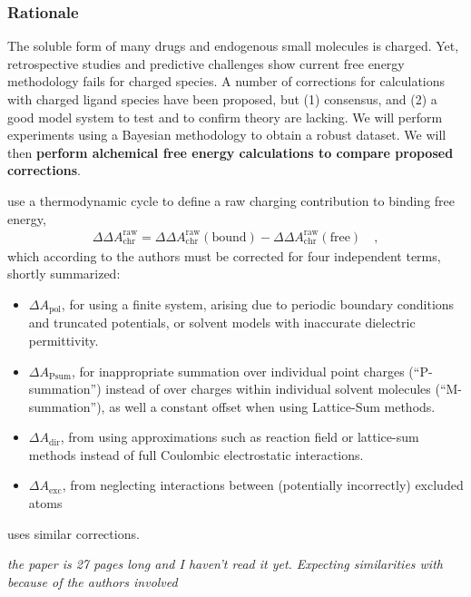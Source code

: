 \documentclass[10pt,final]{article}
\begin{document}
\subsubsection*{Rationale}
The soluble form of many drugs and endogenous small molecules is charged. Yet, retrospective studies and predictive challenges show current free energy methodology fails for charged species\cite{Rocklin2013b,Muddana2014a}.
A number of corrections for calculations with charged ligand species have been proposed, but (1) consensus, and (2) a good model system to test and to confirm theory are lacking\cite{Reif2013a,Rocklin2013a, Lin2014a}. We will perform experiments using a Bayesian methodology to obtain a robust dataset. We will then \textbf{ perform alchemical free energy calculations to compare proposed corrections}.

\textcite{Reif2013a} use a thermodynamic cycle to define a raw charging contribution to binding free energy,
\begin{align}
	\Delta\Delta A^\mathrm{raw}_\mathrm{chr} = \Delta\Delta A^\mathrm{raw}_\mathrm{chr}(\mathrm{bound}) - \Delta\Delta A^\mathrm{raw}_\mathrm{chr}(\mathrm{free}) \quad,
\end{align}
which according to the authors must be corrected for four independent terms, shortly summarized:
\begin{itemize}
  \item $\Delta A_\mathrm{pol}$, for using a finite system, arising due to periodic boundary conditions and truncated potentials, or solvent models with inaccurate dielectric permittivity.
  \item $\Delta A_\mathrm{Psum}$, for inappropriate summation over individual point charges (``P-summation'') instead of over charges within individual solvent molecules  (``M-summation''), as well a constant offset when using Lattice-Sum methods. \cite{Kastenholz2006a}
  \item $\Delta A_\mathrm{dir}$, from using approximations such as reaction field or lattice-sum methods instead of full Coulombic electrostatic interactions.
  \item $\Delta A_\mathrm{exc}$, from neglecting interactions between (potentially incorrectly) excluded atoms 
\end{itemize}

\textcite{Rocklin2013a} uses similar corrections.

\emph{the paper is 27 pages long and I haven't read it yet. Expecting similarities with \textcite{Reif2013a} because of the authors involved}
\end{document}
